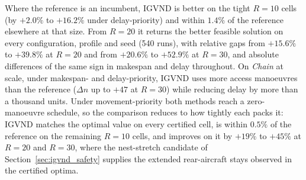 Where the reference is an incumbent, IGVND is better on the tight
$R{=}10$ cells (by $+2.0\%$ to $+16.2\%$ under delay-priority) and within
$1.4\%$ of the reference elsewhere at that size.  From $R{=}20$ it
returns the better feasible solution on every configuration, profile and
seed (540 runs), with relative gaps from $+15.6\%$ to $+39.8\%$ at
$R{=}20$ and from $+20.6\%$ to $+52.9\%$ at $R{=}30$, and absolute
differences of the same sign in makespan and delay throughout.  On
\emph{Chain} at scale, under makespan- and delay-priority, IGVND uses
more access manoeuvres than the reference ($\Delta n$ up to $+47$ at
$R{=}30$) while reducing delay by more than a thousand units.  Under
movement-priority both methods reach a zero-manoeuvre schedule, so the
comparison reduces to how tightly each packs it: IGVND matches the
optimal value on every certified cell, is within $0.5\%$ of the
reference on the remaining $R{=}10$ cells, and improves on it by $+19\%$
to $+45\%$ at $R{=}20$ and $R{=}30$, where the nest-stretch candidate of
Section~\ref{sec:igvnd_safety} supplies the extended rear-aircraft stays
observed in the certified optima.

\FloatBarrier
